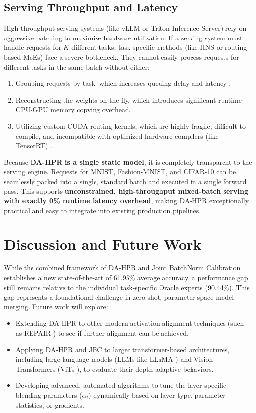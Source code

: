\documentclass{article}
\theoremstyle{plain}
\theoremstyle{definition}
\theoremstyle{remark}
\begin{document}
\subsection{Serving Throughput and Latency}
High-throughput serving systems (like vLLM \cite{kwon2023vllm} or Triton Inference Server) rely on aggressive batching to maximize hardware utilization.
If a serving system must handle requests for $K$ different tasks, task-specific methods (like HNS or routing-based MoEs) face a severe bottleneck.
They cannot easily process requests for different tasks in the same batch without either:
\begin{enumerate}
    \item Grouping requests by task, which increases queuing delay and latency \cite{serving_latency_survey}.
    \item Reconstructing the weights on-the-fly, which introduces significant runtime CPU-GPU memory copying overhead.
    \item Utilizing custom CUDA routing kernels, which are highly fragile, difficult to compile, and incompatible with optimized hardware compilers (like TensorRT) \cite{kwon2023vllm}.
\end{enumerate}
Because \textbf{DA-HPR is a single static model}, it is completely transparent to the serving engine.
Requests for MNIST, Fashion-MNIST, and CIFAR-10 can be seamlessly packed into a single, standard batch and executed in a single forward pass.
This supports \textbf{unconstrained, high-throughput mixed-batch serving with exactly 0\% runtime latency overhead}, making DA-HPR exceptionally practical and easy to integrate into existing production pipelines.

\section{Discussion and Future Work}
\label{submission3:sec:discussion}

While the combined framework of DA-HPR and Joint BatchNorm Calibration establishes a new state-of-the-art of 61.95\% average accuracy, a performance gap still remains relative to the individual task-specific Oracle experts (90.44\%). This gap represents a foundational challenge in zero-shot, parameter-space model merging.
Future work will explore:
\begin{itemize}
    \item Extending DA-HPR to other modern activation alignment techniques (such as REPAIR \cite{jordan2022repair}) to see if further alignment can be achieved.
    \item Applying DA-HPR and JBC to larger transformer-based architectures, including large language models (LLMs like LLaMA \cite{touvron2023llama}) and Vision Transformers (ViTs \cite{dosovitskiy2020image}), to evaluate their depth-adaptive behaviors.
    \item Developing advanced, automated algorithms to tune the layer-specific blending parameters ($\alpha_l$) dynamically based on layer type, parameter statistics, or gradients.
\end{itemize}
\end{document}
